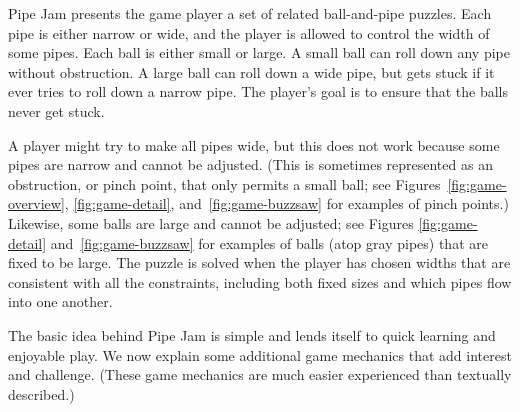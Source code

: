 \documentclass{sig-alternate}
\begin{document}
Pipe Jam presents the game player a set of related ball-and-pipe
puzzles.  Each pipe is either narrow or wide, and the player is
allowed to control the width of some pipes.  Each ball is either small
or large.  A small ball can roll down any pipe without obstruction.  A
large ball can roll down a wide pipe, but gets stuck if it ever tries
to roll down a narrow pipe.  The player's goal is to ensure that the
balls never get stuck.

A player might try to make all pipes wide, but this does not work
because some pipes are narrow and cannot be adjusted.  (This is
sometimes represented as an obstruction, or pinch point, that only
permits a small ball; see Figures~\ref{fig:game-overview},
\ref{fig:game-detail}, and~\ref{fig:game-buzzsaw} for examples of
pinch points.)  Likewise, some balls are large and cannot be adjusted;
see Figures \ref{fig:game-detail} and~\ref{fig:game-buzzsaw} for
examples of balls (atop gray pipes) that are fixed to be large.  The
puzzle is solved when the player has chosen widths that are consistent
with all the constraints, including both fixed sizes and which pipes
flow into one another.

The basic idea behind Pipe Jam is simple and lends itself to quick
learning and enjoyable play.  We now explain some additional game
mechanics that add interest and challenge.  (These game mechanics are
much easier experienced than textually described.)
\end{document}
